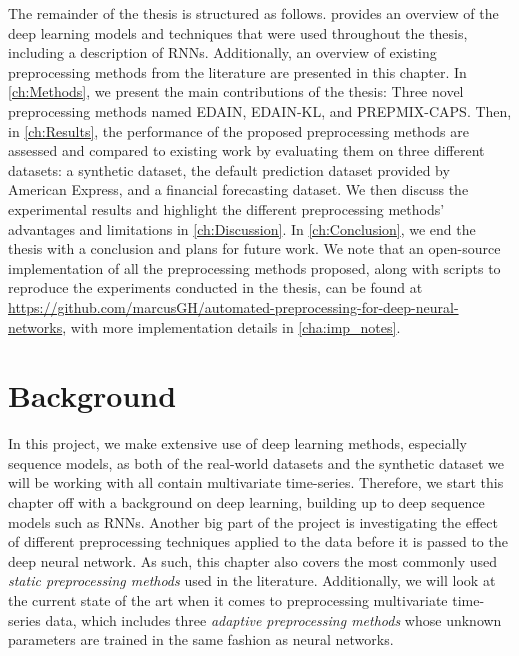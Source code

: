 \documentclass{statsmsc}
\begin{document}
{%
The remainder of the thesis is structured as follows. 
provides an overview of the deep learning models and techniques that were used
throughout the thesis, including a description of \acp{RNN}.
Additionally, an overview of existing preprocessing
methods from the literature are presented in this chapter. In
\cref{ch:Methods}, we present the main contributions of the thesis: Three novel
preprocessing methods named \acs{EDAIN}, \acs{EDAIN-KL}, and \acs{PREPMIX-CAPS}.
Then, in \cref{ch:Results}, the performance of the
proposed preprocessing methods are assessed and compared to existing work by
evaluating them on three different datasets: a synthetic dataset, the default
prediction dataset provided by American Express, and a financial forecasting
dataset. We then discuss the experimental results and highlight the different
preprocessing methods' advantages and limitations in \cref{ch:Discussion}.  In
\cref{ch:Conclusion}, we end the thesis with a conclusion and plans for future
work.
We note that an open-source implementation of all the preprocessing methods proposed,
along with scripts
to reproduce the experiments conducted in the thesis, can be found at
\url{https://github.com/marcusGH/automated-preprocessing-for-deep-neural-networks}, with
more implementation details in \cref{cha:imp_notes}.


\chapter{Background} %
\label{ch:Background}


In this project, we make extensive use of deep learning methods, especially sequence models, as
both of the real-world datasets and the synthetic dataset we will be working with all contain
multivariate time-series.  Therefore, we start this chapter off with a background on deep
learning, building up to deep sequence models such as \acp{RNN}.
Another big part of the project is investigating the effect of different
preprocessing techniques applied to the data before it is passed to the deep neural network.
As such, this chapter also covers the most commonly used \textit{static preprocessing methods} used
in the literature. Additionally, we will look at the current state of the art when it comes
to preprocessing multivariate time-series data, which includes three
\textit{adaptive preprocessing methods} whose unknown parameters are trained in the same
fashion as neural networks.

}
\end{document}
